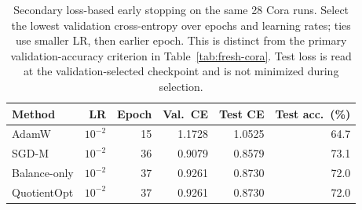 \begin{table}[ht]
\centering\small
\caption{Secondary loss-based early stopping on the same 28 Cora runs. Select the lowest validation cross-entropy over epochs and learning rates; ties use smaller LR, then earlier epoch. This is distinct from the primary validation-accuracy criterion in Table~\ref{tab:fresh-cora}. Test loss is read at the validation-selected checkpoint and is not minimized during selection.}
\label{tab:secondary-ce}
\begin{tabular}{lrrrrr}
\toprule Method & LR & Epoch & Val.\ CE & Test CE & Test acc.\ (\%)\\\midrule
AdamW & $10^{-2}$ & 15 & 1.1728 & 1.0525 & 64.7\\
SGD-M & $10^{-2}$ & 36 & 0.9079 & 0.8579 & 73.1\\
Balance-only & $10^{-2}$ & 37 & 0.9261 & 0.8730 & 72.0\\
\rowcolor{oursbg}QuotientOpt & $10^{-2}$ & 37 & 0.9261 & 0.8730 & 72.0\\
\bottomrule
\end{tabular}
\end{table}
